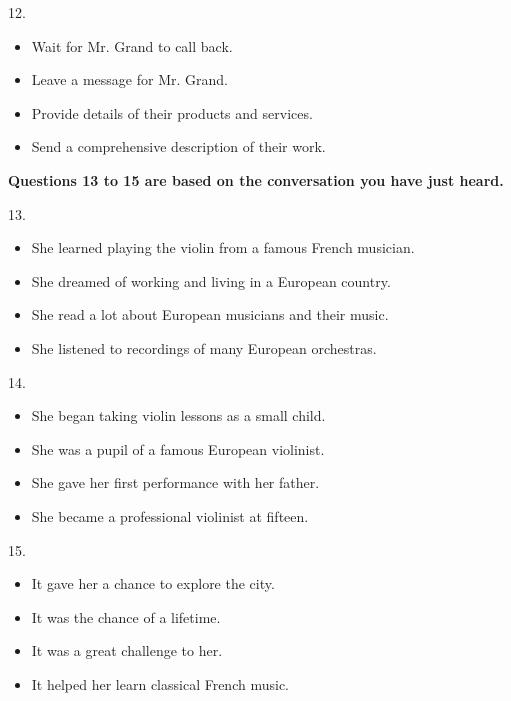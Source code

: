 \documentclass[UTF8,11pt]{ctexart}
\begin{document}
12.


\begin{itemize}[leftmargin=2em,itemsep=.2em,topsep=.4em]\item[A.] Wait for Mr. Grand to call back.
\item[B.] Leave a message for Mr. Grand.
\item[C.] Provide details of their products and services.
\item[D.] Send a comprehensive description of their work.
\end{itemize}

\textbf{Questions 13 to 15 are based on the conversation you have just heard.}


13.


\begin{itemize}[leftmargin=2em,itemsep=.2em,topsep=.4em]\item[A.] She learned playing the violin from a famous French musician.
\item[B.] She dreamed of working and living in a European country.
\item[C.] She read a lot about European musicians and their music.
\item[D.] She listened to recordings of many European orchestras.
\end{itemize}

14.


\begin{itemize}[leftmargin=2em,itemsep=.2em,topsep=.4em]\item[A.] She began taking violin lessons as a small child.
\item[B.] She was a pupil of a famous European violinist.
\item[C.] She gave her first performance with her father.
\item[D.] She became a professional violinist at fifteen.
\end{itemize}

15.


\begin{itemize}[leftmargin=2em,itemsep=.2em,topsep=.4em]\item[A.] It gave her a chance to explore the city.
\item[B.] It was the chance of a lifetime.
\item[C.] It was a great challenge to her.
\item[D.] It helped her learn classical French music.
\end{itemize}
\end{document}
